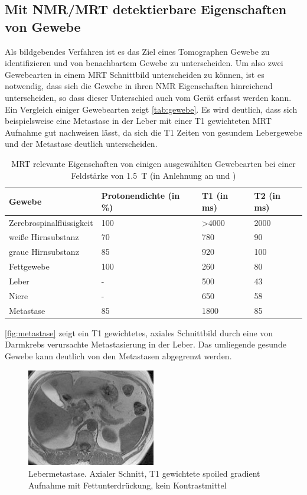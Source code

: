 \subsection{Mit NMR/MRT detektierbare Eigenschaften von Gewebe}
Als bildgebendes Verfahren ist es das Ziel eines Tomographen Gewebe zu identifizieren und von benachbartem Gewebe zu unterscheiden. Um also zwei Gewebearten in einem MRT Schnittbild unterscheiden zu können, ist es notwendig, dass sich die Gewebe in ihren NMR Eigenschaften hinreichend unterscheiden, so dass dieser Unterschied auch vom Gerät erfasst werden kann. Ein Vergleich einiger Gewebearten zeigt \autoref{tab:gewebe}. Es wird deutlich, dass sich beispielsweise eine Metastase in der Leber mit einer T1 gewichteten MRT Aufnahme gut nachweisen lässt, da sich die T1 Zeiten von gesundem Lebergewebe und der Metastase deutlich unterscheiden.

\begin{table}[H]
	\centering
	\caption[MRT relevante Eigenschaften ausgewählter Gewebe]{MRT relevante Eigenschaften von einigen ausgewählten Gewebearten bei einer Feldstärke von \SI{1.5}{\tesla} (in Anlehnung an \cite[S.~16]{Weishaupt2014} und \cite[S.~17]{Reiser2008})}
	\label{tab:gewebe}
	\begin{tabular}{llll}
		\toprule
		\textbf{Gewebe} & \textbf{Protonendichte (in \%)} & \textbf{T1 (in ms)} & \textbf{T2 (in ms)} \\
		\midrule
		Zerebrospinalflüssigkeit & 100 & \textgreater4000 & 2000 \\
		weiße Hirnsubstanz & 70 & 780 & 90 \\
		graue Hirnsubstanz & 85 & 920 & 100 \\
		Fettgewebe & 100 & 260 & 80 \\
		Leber & - & 500 & 43 \\
		Niere & - & 650 & 58 \\
		Metastase & 85 & 1800 & 85 \\
		\bottomrule
	\end{tabular}
\end{table}

\autoref{fig:metastase} zeigt ein T1 gewichtetes, axiales Schnittbild durch eine von Darmkrebs verursachte Metastasierung in der Leber. Das umliegende gesunde Gewebe kann deutlich von den Metastasen abgegrenzt werden.

\begin{figure}[H]
	\centering
	\includegraphics[width=0.5\textwidth]{img/metastase.png}
	\caption[Lebermetastase]{Lebermetastase. Axialer Schnitt, T1 gewichtete spoiled gradient Aufnahme mit Fettunterdrückung, kein Kontrastmittel \cite[S.~872]{Reiser2008}}
	\label{fig:metastase}
\end{figure}

